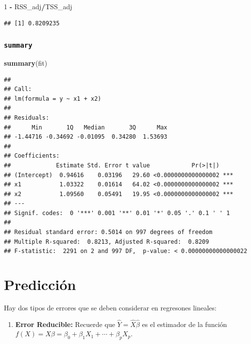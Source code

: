 \documentclass[
  12pt,
]{book}
\newenvironment{Shaded}{\begin{snugshade}}{\end{snugshade}}
\newcommand{\DecValTok}[1]{\textcolor[rgb]{0.00,0.00,0.81}{#1}}
\newcommand{\KeywordTok}[1]{\textcolor[rgb]{0.13,0.29,0.53}{\textbf{#1}}}
\newcommand{\NormalTok}[1]{#1}
\newcommand{\OperatorTok}[1]{\textcolor[rgb]{0.81,0.36,0.00}{\textbf{#1}}}
\newcommand{\StringTok}[1]{\textcolor[rgb]{0.31,0.60,0.02}{#1}}
\providecommand{\tightlist}{%
  \setlength{\itemsep}{0pt}\setlength{\parskip}{0pt}}
\theoremstyle{definition}
\theoremstyle{definition}
\theoremstyle{definition}
\theoremstyle{remark}
\begin{document}
\begin{Shaded}
\begin{Highlighting}[]
\DecValTok{1} \OperatorTok{-}\StringTok{ }\NormalTok{RSS_adj}\OperatorTok{/}\NormalTok{TSS_adj}
\end{Highlighting}
\end{Shaded}

\begin{verbatim}
## [1] 0.8209235
\end{verbatim}

\hypertarget{summary}{%
\subsubsection{\texorpdfstring{\texttt{summary}}{summary}}\label{summary}}

\begin{Shaded}
\begin{Highlighting}[]
\KeywordTok{summary}\NormalTok{(fit)}
\end{Highlighting}
\end{Shaded}

\begin{verbatim}
## 
## Call:
## lm(formula = y ~ x1 + x2)
## 
## Residuals:
##      Min       1Q   Median       3Q      Max 
## -1.44716 -0.34692 -0.01095  0.34280  1.53693 
## 
## Coefficients:
##             Estimate Std. Error t value            Pr(>|t|)    
## (Intercept)  0.94616    0.03196   29.60 <0.0000000000000002 ***
## x1           1.03322    0.01614   64.02 <0.0000000000000002 ***
## x2           1.09560    0.05491   19.95 <0.0000000000000002 ***
## ---
## Signif. codes:  0 '***' 0.001 '**' 0.01 '*' 0.05 '.' 0.1 ' ' 1
## 
## Residual standard error: 0.5014 on 997 degrees of freedom
## Multiple R-squared:  0.8213, Adjusted R-squared:  0.8209 
## F-statistic:  2291 on 2 and 997 DF,  p-value: < 0.00000000000000022
\end{verbatim}

\hypertarget{predicciuxf3n}{%
\section{Predicción}\label{predicciuxf3n}}

Hay dos tipos de errores que se deben considerar en regresones lineales:

\begin{enumerate}
\def\labelenumi{\arabic{enumi}.}
\tightlist
\item
  \textbf{Error Reducible:} Recuerde que \(\hat{Y} = \hat{X}\hat{\beta}\) es el estimador de la función \(f(X)=X\beta = \beta_{0} + \beta_{1}X_{1}+\cdots+\beta_{p}X_{p}\).
\end{enumerate}
\end{document}
